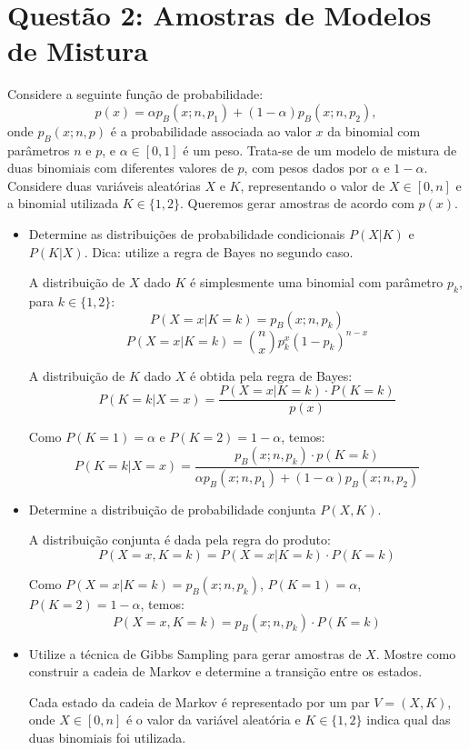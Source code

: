 \section*{Questão 2: Amostras de Modelos de Mistura}

Considere a seguinte função de probabilidade:
\[
p(x) = \alpha p_B(x; n, p_1) + (1 - \alpha)p_B(x; n, p_2),
\]
onde $p_B(x; n, p)$ é a probabilidade associada ao valor $x$ da binomial com parâmetros $n$ e $p$, e $\alpha \in [0,1]$ é um peso. Trata-se de um modelo de mistura de duas binomiais com diferentes valores de $p$, com pesos dados por $\alpha$ e $1 - \alpha$. Considere duas variáveis aleatórias $X$ e $K$, representando o valor de $X \in [0, n]$ e a binomial utilizada $K \in \{1, 2\}$. Queremos gerar amostras de acordo com $p(x)$.

\begin{itemize}
  \item Determine as distribuições de probabilidade condicionais $P(X|K)$ e $P(K|X)$. Dica: utilize a regra de Bayes no segundo caso.
  \begin{resposta}
    A distribuição de $X$ dado $K$ é simplesmente uma binomial com parâmetro $p_k$, para $k \in \{1, 2\}$:
    $$ P (X=x|K=k) = p_B(x; n, p_k)$$
    $$\boxed{P (X=x|K=k) = \binom{n}{x} p_k^x (1 - p_k)^{n - x}} $$
    
    A distribuição de $K$ dado $X$ é obtida pela regra de Bayes:
    $$ P (K=k|X=x) = \frac{P (X=x|K=k) \cdot P(K=k)}{p(x)} $$

    Como $P(K = 1) = \alpha$ e $P(K = 2) = 1 - \alpha$, temos:
    $$ \boxed{P (K=k|X=x) = \frac{p_B(x; n, p_k) \cdot p(K=k)}{\alpha p_B(x; n, p_1) + (1 - \alpha)p_B(x; n, p_2)}} $$
  \end{resposta}
  \item Determine a distribuição de probabilidade conjunta $P(X, K)$.
  \begin{resposta}
    A distribuição conjunta é dada pela regra do produto:
    $$ P(X=x, K=k) = P(X=x|K=k) \cdot P(K=k) $$

    Como $ P (X=x|K=k) = p_B(x; n, p_k)$,  $P(K = 1) = \alpha$, $P(K = 2) = 1 - \alpha$, temos:
    $$ \boxed{P(X=x, K=k) =p_B(x; n, p_k)  \cdot P(K=k)} $$
  \end{resposta}
  \item Utilize a técnica de Gibbs Sampling para gerar amostras de $X$. Mostre como construir a cadeia de Markov e determine a transição entre os estados.
\begin{resposta}
  Cada estado da cadeia de Markov é representado por um par $V = (X, K)$, onde $X \in [0, n]$ é o valor da variável aleatória e $K \in \{1, 2\}$ indica qual das duas binomiais foi utilizada.


\end{resposta}
\end{itemize}
